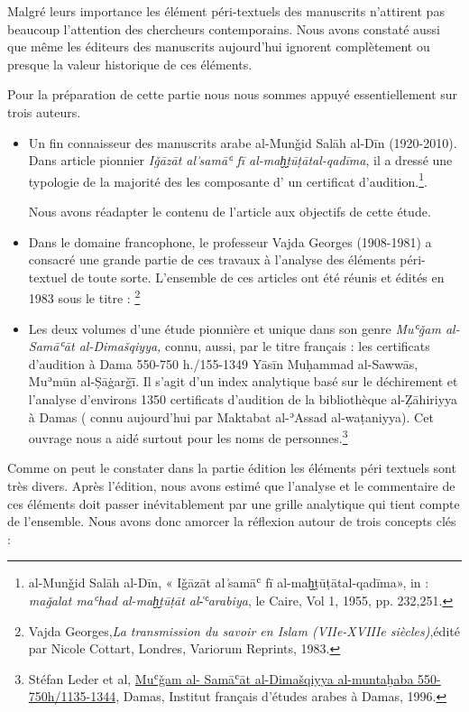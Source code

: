 \documentclass[a4paper,12pt]{report}
\begin{document}
\begin{itemize}
\begin{enumerate}
 Malgré leurs importance les élément péri-textuels des manuscrits n'attirent pas beaucoup l'attention des chercheurs contemporains. Nous avons constaté aussi que même les éditeurs des manuscrits  aujourd'hui ignorent complètement ou presque la valeur historique de ces éléments. 
 
 Pour la préparation de cette partie  nous nous sommes appuyé essentiellement sur trois auteurs. 
 
\begin{itemize} 
\item	Un fin connaisseur des manuscrits arabe al-Munǧid Salāh al-Dīn  (1920-2010).  Dans article pionnier\textit{ Iǧāzāt al ͗samāʿ   fī al-maḫ̬ṭūṭātal-qadīma},  il  a dressé une typologie de la majorité des  les composante d'  un  certificat d’audition.\footnote{al-Munǧid Salāh al-Dīn, « Iǧāzāt al ͗samāʿ   fī al-maḫ̬ṭūṭātal-qadīma», in : \textit{maǧalat maʿhad al-maḫ̬ṭūṭāt al-͑ʿarabiya}, le Caire, Vol 1,  1955, pp. 232,251.}. 

Nous avons réadapter le contenu de l'article aux objectifs de cette étude. 


\item	  Dans le domaine francophone, le professeur  Vajda Georges (1908-1981)  a consacré une grande partie de ces travaux à l’analyse des éléments péri-textuel de toute sorte. L'ensemble de ces articles ont été réunis et édités en 1983 sous le titre :  \footnote{Vajda Georges,\textit{La transmission du savoir en Islam (VIIe-XVIIIe siècles)},édité par Nicole Cottart, Londres, Variorum Reprints, 1983.}


\item 	Les deux volumes d’une étude  pionnière et unique dans son genre  \textit{Muʿǧam al- Samāʿāt al-Dimašqiyya,} connu, aussi, par le titre français : les certificats d’audition à Dama 550-750 h./155-1349 Yāsīn Muḥammad al-Sawwās, Muʾmūn al-Ṣāġarǧī̄. Il s'agit d'un index analytique basé sur le déchirement et l'analyse   d'environs 1350 certificats d'audition de la bibliothèque al-Ẓāhiriyya à Damas ( connu aujourd'hui par Maktabat al-ʾAssad al-waṭaniyya). Cet ouvrage nous a aidé surtout pour les noms de personnes.\footnote{Stéfan Leder et al, \underline{Muʿǧam al- Samāʿāt al-Dimašqiyya  al-muntaḫaba 550-750h/1135-1344,} Damas, Institut français d’études arabes à Damas, 1996.}

\end{itemize}




Comme on peut le constater dans la partie édition  les éléments péri textuels sont très divers. Après l'édition, nous avons estimé que l’analyse et le commentaire de ces éléments doit passer inévitablement par une grille analytique qui tient compte de l’ensemble. Nous avons donc  amorcer  la réflexion autour de trois  concepts clés :  


\end{enumerate}
\end{itemize}
\end{document}
